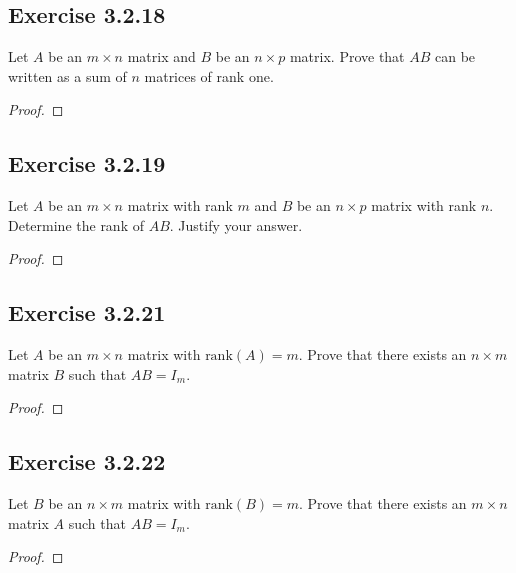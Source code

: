 \subsection*{Exercise 3.2.18} Let \( A  \) be an \( m \times n  \) matrix and \( B  \) be an \( n \times p  \) matrix. Prove that \( AB  \) can be written as a sum of \( n  \) matrices of rank one.
\begin{proof}

\end{proof}

\subsection*{Exercise 3.2.19} Let \( A  \) be an \( m \times n  \) matrix with rank \(  m  \) and \( B  \) be an \( n \times p  \) matrix with rank \( n  \). Determine the rank of \( AB  \). Justify your answer.
\begin{proof}

\end{proof}

\subsection*{Exercise 3.2.21} Let \( A  \) be an \( m \times n  \) matrix with \( \text{rank}(A) = m  \). Prove that there exists an \( n \times m  \) matrix \( B  \) such that \( AB = {I}_{m} \).
\begin{proof}

\end{proof}

\subsection*{Exercise 3.2.22} Let \( B  \) be an \( n \times m  \) matrix with \( \text{rank}(B) = m  \). Prove that there exists an \( m \times n \) matrix \( A  \) such that \( AB = {I}_{m} \).
\begin{proof}

\end{proof}

